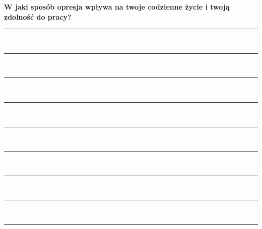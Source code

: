 \newpage
\noindent
\textcolor{ProcessBlue}{\textbf{\Large{W jaki sposób opresja wpływa na twoje codzienne życie i twoją zdolność do pracy?}}}\\
\noindent\rule{\textwidth}{1pt}\\
\noindent\rule{\textwidth}{1pt}\\
\noindent\rule{\textwidth}{1pt}\\
\noindent\rule{\textwidth}{1pt}\\
\noindent\rule{\textwidth}{1pt}\\
\noindent\rule{\textwidth}{1pt}\\
\noindent\rule{\textwidth}{1pt}\\
\noindent\rule{\textwidth}{1pt}\\
\noindent\rule{\textwidth}{1pt}\\\\

